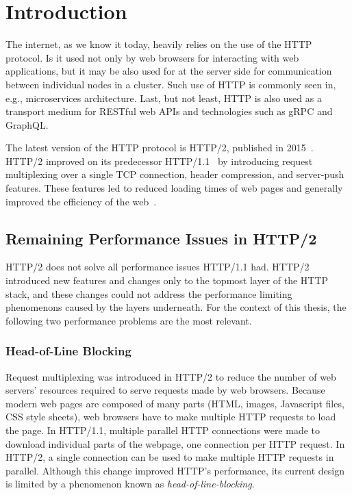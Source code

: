 \chapter{Introduction}


The internet, as we know it today, heavily relies on the use of the HTTP protocol. Is it used not
only by web browsers for interacting with web applications, but it may be also used for at the
server side for communication between individual nodes in a cluster. Such use of HTTP is commonly
seen in, e.g., microservices architecture. Last, but not least, HTTP is also used as a transport
medium for RESTful web APIs and technologies such as gRPC and GraphQL.

The latest version of the HTTP protocol is HTTP/2, published in 2015~\cite{rfc7540}. HTTP/2 improved
on its predecessor HTTP/1.1~\cite{rfc7230} by introducing request multiplexing over a single TCP
connection, header compression, and server-push features. These features led to reduced loading
times of web pages and generally improved the efficiency of the web~\cite{deSaxce2015}.

\section{Remaining Performance Issues in HTTP/2}

HTTP/2 does not solve all performance issues HTTP/1.1 had. HTTP/2 introduced new features and
changes only to the topmost layer of the HTTP stack, and these changes could not address the
performance limiting phenomenons caused by the layers underneath. For the context of this thesis,
the following two performance problems are the most relevant.

\subsection*{Head-of-Line Blocking}

Request multiplexing was introduced in HTTP/2 to reduce the number of web servers' resources
required to serve requests made by web browsers. Because modern web pages are composed of many parts
(HTML, images, Javascript files, CSS style sheets), web browsers have to make multiple HTTP requests
to load the page. In HTTP/1.1, multiple parallel HTTP connections were made to download individual
parts of the webpage, one connection per HTTP request. In HTTP/2, a single connection can be used to
make multiple HTTP requests in parallel. Although this change improved HTTP's performance, its
current design is limited by a phenomenon known as \textit{\gls{head-of-line-blocking}}.

